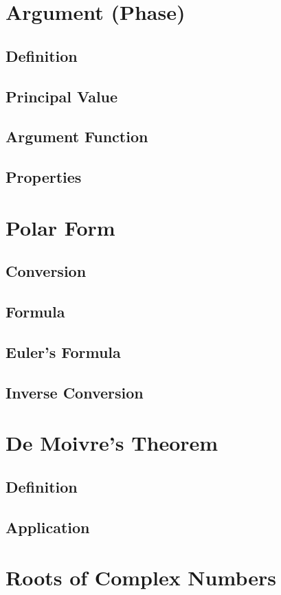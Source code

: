 \documentclass[12pt]{article}
\begin{document}
    \section{Argument (Phase)}
    \subsection{Definition}
    \subsection{Principal Value}
    \subsection{Argument Function}
    \subsection{Properties}

    \section{Polar Form}
    \subsection{Conversion}
    \subsection{Formula}
    \subsection{Euler's Formula}
    \subsection{Inverse Conversion}

    \section{De Moivre's Theorem}
    \subsection{Definition}
    \subsection{Application}

    \section{Roots of Complex Numbers}
\end{document}
